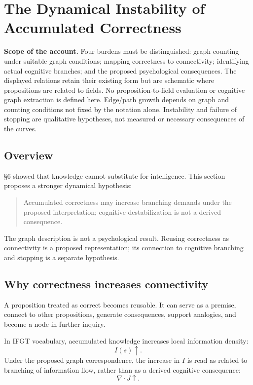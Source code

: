 \section{The Dynamical Instability of Accumulated Correctness}

\noindent\textbf{Scope of the account.} Four burdens must be distinguished: graph counting under suitable graph conditions; mapping correctness to connectivity; identifying actual cognitive branches; and the proposed psychological consequences. The displayed relations retain their existing form but are schematic where propositions are related to fields. No proposition-to-field evaluation or cognitive graph extraction is defined here. Edge/path growth depends on graph and counting conditions not fixed by the notation alone. Instability and failure of stopping are qualitative hypotheses, not measured or necessary consequences of the curves.


\subsection{Overview}

\S{}6 showed that knowledge cannot substitute for intelligence. This section proposes a stronger dynamical hypothesis:

\begin{quote}
Accumulated correctness may increase branching demands under the proposed interpretation; cognitive destabilization is not a derived consequence.
\end{quote}

The graph description is not a psychological result. Reusing correctness as connectivity is a proposed representation; its connection to cognitive branching and stopping is a separate hypothesis.

\subsection{Why correctness increases connectivity}

A proposition treated as correct becomes reusable. It can serve as a premise, connect to other propositions, generate consequences, support analogies, and become a node in further inquiry.

In IFGT vocabulary, accumulated knowledge increases local information density:
\[
I(s)\uparrow.
\]
Under the proposed graph correspondence, the increase in \(I\) is read as related to branching of information flow, rather than as a derived cognitive consequence:
\[
\nabla\cdot J \uparrow.
\]

